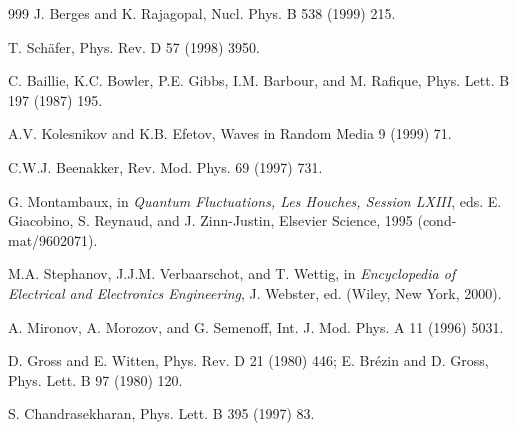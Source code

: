 \begin{thebibliography}{999}
      J. Berges and K. Rajagopal, 
                      Nucl. Phys. B 538 (1999) 215.            %

      T. Sch\"afer, 
                      Phys. Rev. D 57 (1998) 3950.             %

     C. Baillie, K.C. Bowler, P.E. Gibbs, I.M. Barbour, and
                      M. Rafique, 
                      Phys. Lett. B 197 (1987) 195.            %

   A.V. Kolesnikov and K.B. Efetov, 
                      Waves in Random Media 9 (1999) 71.           %

  C.W.J. Beenakker, 
                      Rev. Mod. Phys. 69 (1997) 731.            %

  G. Montambaux, 
                      in {\it Quantum Fluctuations, Les Houches,
                      Session LXIII}, 
                      eds. E. Giacobino, S. Reynaud, and J. Zinn-Justin, 
                      Elsevier Science, 1995
                      (cond-mat/9602071).                         %

        M.A. Stephanov, J.J.M. Verbaarschot, and T. Wettig,
                      in {\it Encyclopedia of Electrical and
                      Electronics Engineering},
                      J. Webster, ed. (Wiley, New York, 2000).    %

     A. Mironov, A. Morozov, and G. Semenoff,
                      Int. J. Mod. Phys. A 11 (1996) 5031.        %

          D. Gross and E. Witten, 
                      Phys. Rev. D 21 (1980) 446;                 %
                      E. Br\'ezin and D. Gross, 
                      Phys. Lett. B 97 (1980) 120.                %

     S. Chandrasekharan,
                      Phys. Lett. B 395 (1997) 83.                %


\end{thebibliography}
